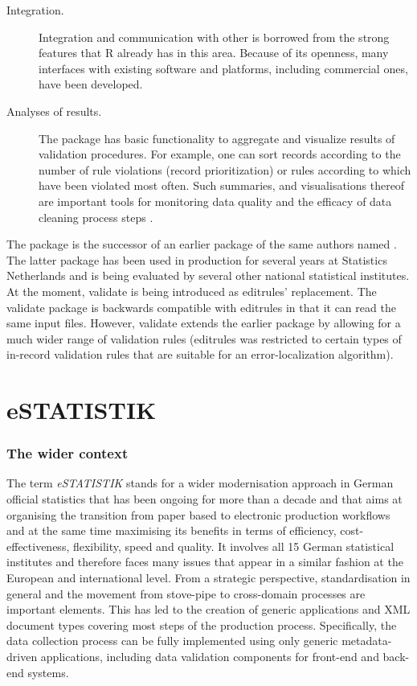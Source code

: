 \begin{description}
\item[Integration.] Integration and communication with other is borrowed from
the strong features that R already has in this area. Because of its openness,
many interfaces with existing software and platforms, including commercial
ones, have been developed.

\item[Analyses of results.] The package has basic functionality to aggregate and
visualize results of validation  procedures. For example, one can sort records
according to the number of rule violations (record prioritization) or rules
according to which have been violated most often. Such summaries, and visualisations
thereof are important tools for monitoring data quality and the efficacy of 
data cleaning process steps \citep{pannekoek:2014}.
\end{description}

The  package is the successor of an earlier package of the same
authors named . The latter package has been used in production
for several years at Statistics Netherlands and is being evaluated by several
other national statistical institutes. At the moment, validate is being
introduced as editrules' replacement. The validate package is backwards
compatible with editrules in that it can read the same input files. However,
validate extends the earlier package by allowing for a much wider range of
validation rules (editrules was restricted to certain types of in-record
validation rules that are suitable for an error-localization algorithm).




\section{eSTATISTIK}

\subsubsection{The wider context}
The term \textit{eSTATISTIK} stands for a wider modernisation approach in German official statistics that has been ongoing for more than a decade and that aims at organising the transition from paper based to electronic production workflows and at the same time maximising its benefits in terms of efficiency, cost-effectiveness, flexibility, speed and quality. It involves all 15 German statistical institutes and therefore faces many issues that appear in a similar fashion at the European and international level. From a strategic perspective, standardisation in general and the movement from stove-pipe to cross-domain processes are important elements. This has led to the creation of generic applications and XML document types covering most steps of the production process. Specifically, the data collection process can be fully implemented using only generic metadata-driven applications, including data validation components for front-end and back-end systems.

